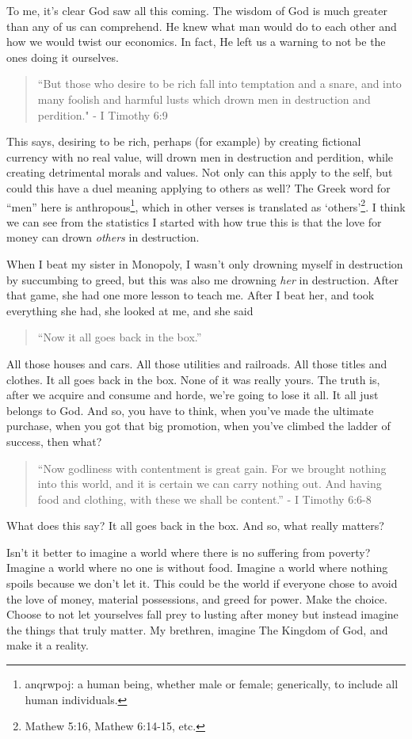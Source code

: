 \documentclass[11pt]{article}
\begin{document}
\begin{multicols}{2}
To me, it’s clear God saw all this coming. The wisdom of God is much greater than any of us can comprehend. He knew what man would do to each other and how we would twist our economics. In fact, He left us a warning to not be the ones doing it ourselves. 
\begin{quotation}
``But those who desire to be rich fall into temptation and a snare, and into many foolish and harmful lusts which drown men in destruction and perdition." - I Timothy 6:9
\end{quotation}
This says, desiring to be rich, perhaps (for example) by creating fictional currency with no real value, will drown men in destruction and perdition, while creating detrimental morals and values. Not only can this apply to the self, but could this have a duel meaning applying to others as well? The Greek word for ``men” here is anthropous\footnote{anqrwpoj: a human being, whether male or female; generically, to include all human individuals.}, which in other verses is translated as `others'\footnote{Mathew 5:16, Mathew 6:14-15, etc.}. I think we can see from the statistics I started with how true this is that the love for money can drown \textit{others} in destruction.

When I beat my sister in Monopoly, I wasn't only drowning myself in destruction by succumbing to greed, but this was also me drowning \textit{her} in destruction. After that game, she had one more lesson to teach me. After I beat her, and took everything she had, she looked at me, and she said 
\begin{quotation}
``Now it all goes back in the box.”
\end{quotation}
All those houses and cars. All those utilities and railroads. All those titles and clothes. It all goes back in the box. None of it was really yours. The truth is, after we acquire and consume and horde, we’re going to lose it all. It all just belongs to God. And so, you have to think, when you’ve made the ultimate purchase, when you got that big promotion, when you've climbed the ladder of success, then what?
\begin{quotation}
``Now godliness with contentment is great gain. For we brought nothing into this world, and it is certain we can carry nothing out. And having food and clothing, with these we shall be content.” - I Timothy 6:6-8
\end{quotation} 
What does this say? It all goes back in the box. And so, what really matters?

Isn't it better to imagine a world where there is no suffering from poverty? Imagine a world where no one is without food. Imagine a world where nothing spoils because we don’t let it. This could be the world if everyone chose to avoid the love of money, material possessions, and greed for power. Make the choice. Choose to not let yourselves fall prey to lusting after money but instead imagine the things that truly matter. My brethren, imagine The Kingdom of God, and make it a reality.


\end{multicols}
\end{document}
